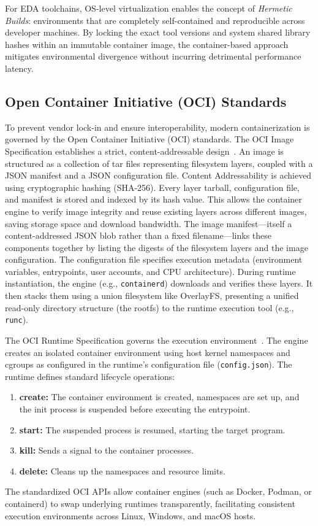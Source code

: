 For EDA toolchains, OS-level virtualization enables the concept of \textit{Hermetic Builds}: environments that are completely self-contained and reproducible across developer machines. By locking the exact tool versions and system shared library hashes within an immutable container image, the container-based approach mitigates environmental divergence without incurring detrimental performance latency.

\subsection{Open Container Initiative (OCI) Standards}
To prevent vendor lock-in and ensure interoperability, modern containerization is governed by the Open Container Initiative (OCI) standards. The OCI Image Specification establishes a strict, content-addressable design~\cite{oci2017image}. An image is structured as a collection of tar files representing filesystem layers, coupled with a JSON manifest and a JSON configuration file.
Content Addressability is achieved using cryptographic hashing (SHA-256). Every layer tarball, configuration file, and manifest is stored and indexed by its hash value. This allows the container engine to verify image integrity and reuse existing layers across different images, saving storage space and download bandwidth.
The image manifest---itself a content-addressed JSON blob rather than a fixed filename---links these components together by listing the digests of the filesystem layers and the image configuration. The configuration file specifies execution metadata (environment variables, entrypoints, user accounts, and CPU architecture).
During runtime instantiation, the engine (e.g., \texttt{containerd}) downloads and verifies these layers. It then stacks them using a union filesystem like OverlayFS, presenting a unified read-only directory structure (the rootfs) to the runtime execution tool (e.g., \texttt{runc}).

The OCI Runtime Specification governs the execution environment~\cite{oci2017runtime}. The engine creates an isolated container environment using host kernel namespaces and cgroups as configured in the runtime's configuration file (\texttt{config.json}). The runtime defines standard lifecycle operations:
\begin{enumerate}
    \item \textbf{create:} The container environment is created, namespaces are set up, and the init process is suspended before executing the entrypoint.
    \item \textbf{start:} The suspended process is resumed, starting the target program.
    \item \textbf{kill:} Sends a signal to the container processes.
    \item \textbf{delete:} Cleans up the namespaces and resource limits.
\end{enumerate}
The standardized OCI APIs allow container engines (such as Docker, Podman, or containerd) to swap underlying runtimes transparently, facilitating consistent execution environments across Linux, Windows, and macOS hosts.

